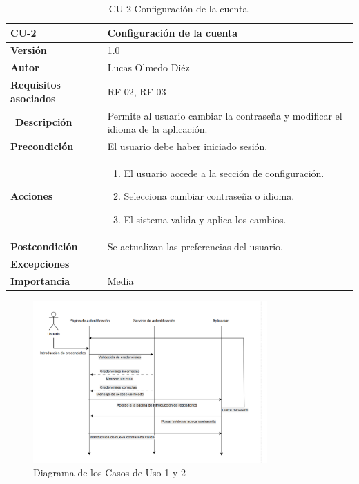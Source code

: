 \clearpage
\begin{table}[p]
    \centering
    \begin{tabularx}{\linewidth}{ p{} p{} }
        \toprule
        \textbf{CU-2}    & Configuración de la cuenta \\
        \midrule
        \textbf{Versión}              & 1.0 \\
        \textbf{Autor}                & Lucas Olmedo Diéz \\
        \textbf{Requisitos asociados} & RF-02, RF-03 \\\
        \textbf{Descripción}          & Permite al usuario cambiar la contraseña y modificar el idioma de la aplicación. \\
        \textbf{Precondición}         & El usuario debe haber iniciado sesión. \\
        \textbf{Acciones}             &
        \begin{enumerate}
            \def\labelenumi{\arabic{enumi}.}
            \tightlist
            \item El usuario accede a la sección de configuración.
            \item Selecciona cambiar contraseña o idioma.
            \item El sistema valida y aplica los cambios.
        \end{enumerate}\\
        \textbf{Postcondición}        & Se actualizan las preferencias del usuario. \\
        \textbf{Excepciones}          & \\
        \textbf{Importancia}          & Media \\
        \bottomrule
    \end{tabularx}
    \caption{CU-2 Configuración de la cuenta.}
\end{table}

\begin{figure}[H]
\centering
\includegraphics[width=0.8\textwidth]{img/DiagramaCU1-CU2.png}
\caption{Diagrama de los Casos de Uso 1 y 2}
\label{fig:DiagramaCU1-CU2}
\end{figure}

